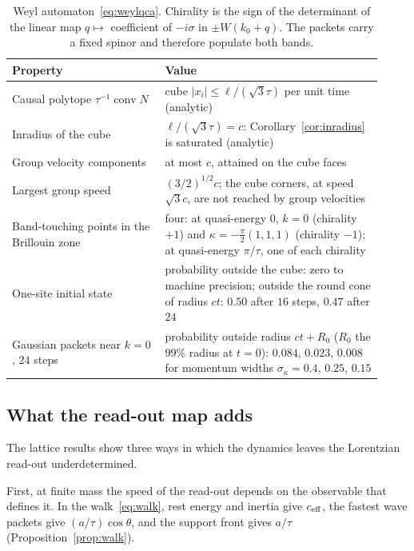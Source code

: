 \documentclass[12pt]{article}
\theoremstyle{definition}
\theoremstyle{remark}
\newcommand{\conv}{\operatorname{conv}}
\begin{document}
\begin{table}[ht]
\centering
\small
\begin{tabular}{@{}P{0.38\linewidth}P{0.54\linewidth}@{}}
\toprule
\textbf{Property} & \textbf{Value}\\
\midrule
Causal polytope $\tau^{-1}\conv N$ & cube $|x_i|\le\ell/(\sqrt3\tau)$ per unit time (analytic) \\
Inradius of the cube & $\ell/(\sqrt3\tau)=c$: Corollary~\ref{cor:inradius} is saturated (analytic) \\
Group velocity components & at most $c$, attained on the cube faces \\
Largest group speed & $(3/2)^{1/2}c$; the cube corners, at speed $\sqrt3c$, are not reached by group velocities \\
Band-touching points in the Brillouin zone & four: at quasi-energy $0$, $k=0$ (chirality $+1$) and $\kappa=-\tfrac\pi2(1,1,1)$ (chirality $-1$); at quasi-energy $\pi/\tau$, one of each chirality \\
One-site initial state & probability outside the cube: zero to machine precision; outside the round cone of radius $ct$: $0.50$ after $16$ steps, $0.47$ after $24$ \\
Gaussian packets near $k=0$, $24$ steps & probability outside radius $ct+R_0$ ($R_0$ the $99\%$ radius at $t=0$): $0.084$, $0.023$, $0.008$ for momentum widths $\sigma_\kappa=0.4$, $0.25$, $0.15$ \\
\bottomrule
\end{tabular}
\caption{Weyl automaton~\eqref{eq:weylqca}. Chirality is the sign of the determinant of the linear map $q\mapsto$ coefficient of $-i\sigma$ in $\pm W(k_0+q)$. The packets carry a fixed spinor and therefore populate both bands.}
\label{tab:weyl}
\end{table}

\subsection{What the read-out map adds}
\label{sec:readout}

The lattice results show three ways in which the dynamics leaves the Lorentzian read-out underdetermined.

First, at finite mass the speed of the read-out depends on the observable that defines it. In the walk~\eqref{eq:walk}, rest energy and inertia give $c_{\rm eff}$, the fastest wave packets give $(a/\tau)\cos\theta$, and the support front gives $a/\tau$ (Proposition~\ref{prop:walk}).
\end{document}
